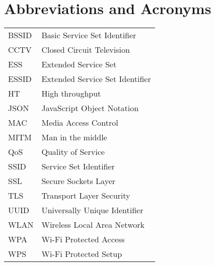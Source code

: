 \chapter*{Abbreviations and Acronyms}


\noindent
\begin{longtable}{@{}p{}p{}@{}}
BSSID & Basic Service Set Identifier \\
CCTV & Closed Circuit Television \\
ESS & Extended Service Set \\
ESSID & Extended Service Set Identifier \\
HT & High throughput \\
JSON & JavaScript Object Notation \\
MAC & Media Access Control \\
MITM & Man in the middle \\
QoS & Quality of Service \\
SSID & Service Set Identifier \\
SSL & Secure Sockets Layer \\
TLS & Transport Layer Security \\
UUID & Universally Unique Identifier \\
WLAN & Wireless Local Area Network \\
WPA & Wi-Fi Protected Access \\
WPS & Wi-Fi Protected Setup \\
\end{longtable}

